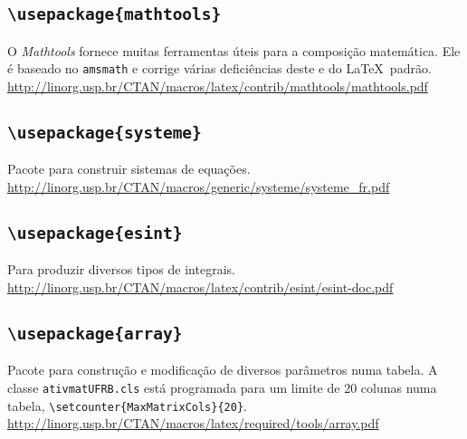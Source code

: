 \subsection*{\texttt{\textbackslash usepackage\{mathtools\}}}
O \emph{Mathtools} fornece muitas ferramentas úteis para a composição
matemática.
Ele é baseado no \texttt{amsmath} e corrige várias deficiências deste e do 
\LaTeX\ padrão.\\
{\small\url{http://linorg.usp.br/CTAN/macros/latex/contrib/mathtools/mathtools.pdf}}

\subsection*{\texttt{\textbackslash usepackage\{systeme\}}}
Pacote para construir sistemas de equações.\\
{\small\url{http://linorg.usp.br/CTAN/macros/generic/systeme/systeme_fr.pdf}}

\subsection*{\texttt{\textbackslash usepackage\{esint\}}}
Para produzir diversos tipos de integrais.\\
{\small\url{http://linorg.usp.br/CTAN/macros/latex/contrib/esint/esint-doc.pdf}}

\subsection*{\texttt{\textbackslash usepackage\{array\}}} 
Pacote para construção e modificação de diversos parâmetros numa tabela.
A classe \texttt{ativmatUFRB.cls} está programada para um limite de 20 colunas
numa tabela,  \verb|\setcounter{MaxMatrixCols}{20}|.\\
{\small\url{http://linorg.usp.br/CTAN/macros/latex/required/tools/array.pdf}}

